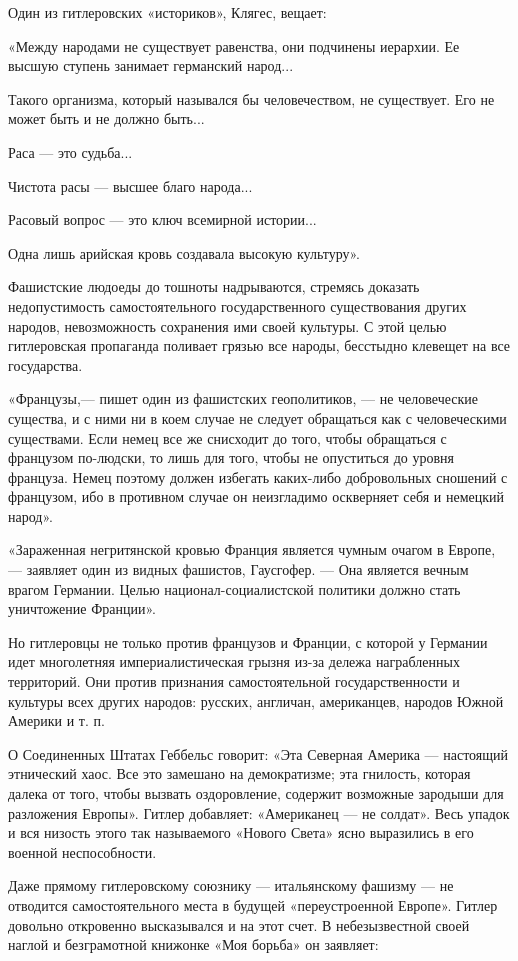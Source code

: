 \documentclass[12pt, a4paper, openany]{book}
\begin{document}
Один из гитлеровских «историков», Клягес, вещает:

«Между народами не существует равенства, они подчинены иерархии. Ее высшую ступень занимает германский народ...

Такого организма, который назывался бы человечеством, не существует. Его не может быть и не должно быть...

Раса — это судьба...

Чистота расы — высшее благо народа...

Расовый вопрос — это ключ всемирной истории...

Одна лишь арийская кровь создавала высокую культуру».

Фашистские людоеды до тошноты надрываются, стремясь доказать недопустимость самостоятельного государственного существования других народов, невозможность сохранения ими своей культуры. С этой целью гитлеровская пропаганда поливает грязью все народы, бесстыдно клевещет на все государства.

«Французы,— пишет один из фашистских геополитиков, — не человеческие существа, и с ними ни в коем случае не следует обращаться как с человеческими существами. Если немец все же снисходит до того, чтобы обращаться с французом по-людски, то лишь для того, чтобы не опуститься до уровня француза. Немец поэтому должен избегать каких-либо добровольных сношений с французом, ибо в противном случае он неизгладимо оскверняет себя и немецкий народ».

«Зараженная негритянской кровью Франция является чумным очагом в Европе, — заявляет один из видных фашистов, Гаусгофер. — Она является вечным врагом Германии. Целью национал-социалистской политики должно стать уничтожение Франции».

Но гитлеровцы не только против французов и Франции, с которой у Германии идет многолетняя империалистическая грызня из-за дележа награбленных территорий. Они против признания самостоятельной государственности и культуры всех других народов: русских, англичан, американцев, народов Южной Америки и т. п.

О Соединенных Штатах Геббельс говорит: «Эта Северная Америка — настоящий этнический хаос. Все это замешано на демократизме; эта гнилость, которая далека от того, чтобы вызвать оздоровление, содержит возможные зародыши для разложения Европы». Гитлер добавляет: «Американец — не солдат». Весь упадок и вся низость этого так называемого «Нового Света» ясно выразились в его военной неспособности.

Даже прямому гитлеровскому союзнику — итальянскому фашизму — не отводится самостоятельного места в будущей «переустроенной Европе». Гитлер довольно откровенно высказывался и на этот счет. В небезызвестной своей наглой и безграмотной книжонке «Моя борьба» он заявляет:
\end{document}
